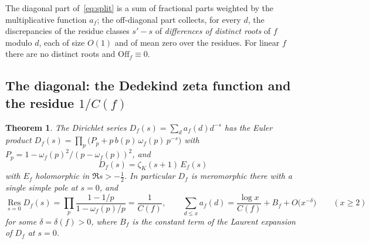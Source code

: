 \documentclass[11pt,a4paper]{article}
\newtheorem{theorem}{Theorem}
\theoremstyle{remark}\newtheorem{remark}[theorem]{Remark}
\begin{document}
The diagonal part of~\eqref{eq:split} is a sum of fractional parts weighted by the multiplicative
function $a_f$; the off-diagonal part collects, for every $d$, the discrepancies of the residue classes
$s'-s$ of \emph{differences of distinct roots} of $f$ modulo $d$, each of size $O(1)$ and of mean zero
over the residues. For linear $f$ there are no distinct roots and $\mathrm{Off}_f\equiv0$.

\subsection{The diagonal: the Dedekind zeta function and the residue $1/C(f)$}\label{sec:diag}

\begin{theorem}\label{thm:dirichlet}
The Dirichlet series $D_f(s)=\sum_d a_f(d)d^{-s}$ has the Euler product
$D_f(s)=\prod_p\bigl(P_p+p\,b(p)\,\omega_f(p)\,p^{-s}\bigr)$ with $P_p=1-\omega_f(p)^2/(p-\omega_f(p))^2$,
and
\[
D_f(s)=\zeta_K(s+1)\,E_f(s)
\]
with $E_f$ holomorphic in $\Re s>-\tfrac12$. In particular $D_f$ is meromorphic there with a single
simple pole at $s=0$, and
\[
\operatorname*{Res}_{s=0}D_f(s)=\prod_p\frac{1-1/p}{1-\omega_f(p)/p}=\frac1{C(f)},\qquad
\sum_{d\le x}a_f(d)=\frac{\log x}{C(f)}+B_f+O\bigl(x^{-\delta}\bigr)\qquad(x\ge2)
\]
for some $\delta=\delta(f)>0$, where $B_f$ is the constant term of the Laurent expansion of $D_f$ at $s=0$.
\end{theorem}
\end{document}
